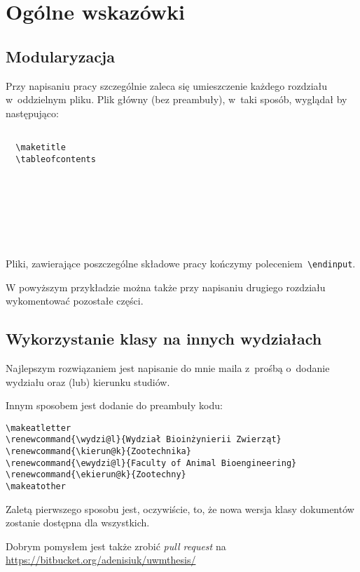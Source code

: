\section{Ogólne wskazówki}
\subsection{Modularyzacja}
Przy napisaniu pracy szczególnie zaleca się umieszczenie każdego rozdziału w~oddzielnym pliku. Plik główny (bez preambuły), w~taki sposób, wyglądał by następująco:
\begin{verbatim}

  \maketitle
  \tableofcontents
  
  
  
  
  
  
  

\end{verbatim}

Pliki, zawierające poszczególne składowe pracy kończymy poleceniem~\verb|\endinput|.


W powyższym przykładzie można także przy napisaniu drugiego rozdziału wykomentować pozostałe części.

\subsection{Wykorzystanie klasy na innych wydziałach}\label{inne}
Najlepszym rozwiązaniem jest napisanie do mnie maila z~prośbą o~dodanie wydziału oraz (lub) kierunku studiów. 

Innym sposobem jest dodanie do preambuły kodu:
\begin{verbatim}
\makeatletter
\renewcommand{\wydzi@l}{Wydział Bioinżynierii Zwierząt}
\renewcommand{\kierun@k}{Zootechnika}
\renewcommand{\ewydzi@l}{Faculty of Animal Bioengineering}
\renewcommand{\ekierun@k}{Zootechny}
\makeatother
\end{verbatim}
Zaletą pierwszego sposobu jest, oczywiście, to, że nowa wersja klasy dokumentów zostanie dostępna dla wszystkich.

Dobrym pomysłem jest także zrobić \emph{pull request} na
  \url{https://bitbucket.org/adenisiuk/uwmthesis/}